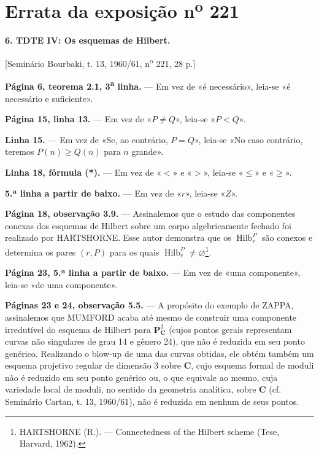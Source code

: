 \clearpage
\chapter*{Errata da exposição n\textsuperscript{o} 221}
\setcounter{footnote}{3}

\noindent\textbf{6. TDTE IV: Os esquemas de Hilbert.}

\begin{center}
[Seminário Bourbaki, t. 13, 1960/61, n\textsuperscript{o} 221, 28 p.]
\end{center}

\noindent\textbf{Página 6, teorema 2.1, 3\textsuperscript{a} linha.} --- Em vez de
«é necessário», leia-se «é necessário e suficiente».

\noindent\textbf{Página 15, linha 13.} --- Em vez de «$P\neq Q$», leia-se
«$P<Q$».

\noindent\textbf{Linha 15.} --- Em vez de «Se, ao contrário, $P=Q$», leia-se
«No caso contrário, teremos $P(n)\geq Q(n)$ para $n$ grande».

\noindent\textbf{Linha 18, fórmula (*).} --- Em vez de «$<$» e «$>$»,
leia-se «$\leq$» e «$\geq$».

\noindent\textbf{5.ª linha a partir de baixo.} --- Em vez de «$r$», leia-se
«$Z$».

\noindent\textbf{Página 18, observação 3.9.} --- Assinalemos que o estudo das
componentes conexas dos esquemas de Hilbert sobre um corpo algebricamente
fechado foi realizado por HARTSHORNE. Esse autor demonstra que os
$\operatorname{Hilb}^{P}_{r}$ são conexos e determina os pares $(r,P)$ para
os quais $\operatorname{Hilb}^{P}_{r}\neq\varnothing$\footnote{HARTSHORNE
(R.). --- Connectedness of the Hilbert scheme (Tese, Harvard, 1962).}.

\noindent\textbf{Página 23, 5.ª linha a partir de baixo.} --- Em vez de «uma
componente», leia-se «de uma componente».

\noindent\textbf{Páginas 23 e 24, observação 5.5.} --- A propósito do exemplo
de ZAPPA, assinalemos que MUMFORD acaba até mesmo de construir uma componente
irredutível do esquema de Hilbert para $\mathbf P^3_{\mathbf C}$ (cujos pontos
gerais representam curvas não singulares de grau 14 e gênero 24), que não é
reduzida em seu ponto genérico. Realizando o blow-up de uma das curvas obtidas,
ele obtém também um esquema projetivo regular de dimensão 3 sobre $\mathbf C$,
cujo esquema formal de moduli não é reduzido em seu ponto genérico ou, o que
equivale ao mesmo, cuja variedade local de moduli, no sentido da geometria
analítica, sobre $\mathbf C$ (cf. Seminário Cartan, t. 13, 1960/61), não é
reduzida em nenhum de seus pontos.
